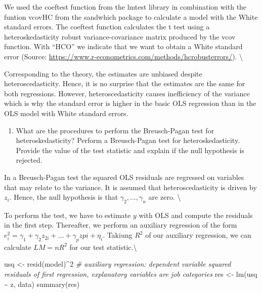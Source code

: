 \documentclass[
]{article}
\newenvironment{Shaded}{\begin{snugshade}}{\end{snugshade}}
\newcommand{\CommentTok}[1]{\textcolor[rgb]{0.56,0.35,0.01}{\textit{#1}}}
\newcommand{\DecValTok}[1]{\textcolor[rgb]{0.00,0.00,0.81}{#1}}
\newcommand{\FunctionTok}[1]{\textcolor[rgb]{0.00,0.00,0.00}{#1}}
\newcommand{\NormalTok}[1]{#1}
\newcommand{\OtherTok}[1]{\textcolor[rgb]{0.56,0.35,0.01}{#1}}
\newcommand{\SpecialCharTok}[1]{\textcolor[rgb]{0.00,0.00,0.00}{#1}}
\providecommand{\tightlist}{%
  \setlength{\itemsep}{0pt}\setlength{\parskip}{0pt}}
\begin{document}
We used the coeftest function from the lmtest library in combination
with the funtion vcovHC from the sandwhich package to calculate a model
with the White standard errors. The coeftest function calculates the t
test using a heteroskedasticity robust variance-covariance matrix
produced by the vcov function. With ``HCO'' we indicate that we want to
obtain a White standard error (Source:
\url{https://www.r-econometrics.com/methods/hcrobusterrors/}).
\textbackslash{}

Corresponding to the theory, the estimates are unbiased despite
heteroscedasticity. Hence, it is no surprise that the estimates are the
same for both regressions. However, heteroscedasticity causes
inefficiency of the variance which is why the standard error is higher
in the basic OLS regression than in the OLS model with White standard
errors.

\begin{enumerate}
\def\labelenumi{\alph{enumi})}
\setcounter{enumi}{1}
\tightlist
\item
  What are the procedures to perform the Breusch-Pagan test for
  heteroskedasticity? Perform a Breusch-Pagan test for
  heteroskedasticity. Provide the value of the test statistic and
  explain if the null hypothesis is rejected.
\end{enumerate}

In a Breusch-Pagan test the squared OLS residuals are regressed on
variables that may relate to the variance. It is assumed that
heteroscedasticity is driven by \(z_i\). Hence, the null hypothesis is
that \(\gamma_2,...,\gamma_n\) are zero. \textbackslash{}

To perform the test, we have to estimate \(y\) with OLS and compute the
residuals in the first step. Thereafter, we perform an auxiliary
regression of the form
\(e_i^2 = \gamma_1 + \gamma_2 z_{2i} + ... + \gamma_p z{pi} + \eta_i\).
Takiung \(R^2\) of our auxiliary regression, we can calculate
\(LM = n R^2\) for our test statistic.\textbackslash{}

\begin{Shaded}
\begin{Highlighting}[]
\NormalTok{usq }\OtherTok{\textless{}{-}} \FunctionTok{resid}\NormalTok{(model)}\SpecialCharTok{\^{}}\DecValTok{2}
\CommentTok{\# auxiliary regression: dependent variable squared residuals of first regression, explanatory variables are job categories}
\NormalTok{res }\OtherTok{\textless{}{-}} \FunctionTok{lm}\NormalTok{(usq }\SpecialCharTok{\textasciitilde{}}\NormalTok{ z, data)}
\FunctionTok{summary}\NormalTok{(res)}
\end{Highlighting}
\end{Shaded}
\end{document}
